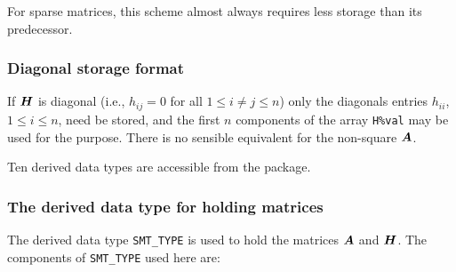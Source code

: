 \documentclass{galahad}
\begin{document}
For sparse matrices, this scheme almost always requires less storage than 
its predecessor.

\subsubsection{Diagonal storage format}\label{diagonal}
If ${\bm{H}}$ is diagonal (i.e., $h_{ij} = 0$ for all $1 \leq i \neq j \leq n$)
only the diagonals entries $h_{ii}$, $1 \leq i \leq n$,  need be stored,
and the first $n$ components of the array {\tt H\%val} may be used for 
the purpose. There is no sensible equivalent for the non-square ${\bm{A}}$.








\galtypes
Ten derived data types are accessible from the package.


\subsubsection{The derived data type for holding matrices}\label{typesmt}
The derived data type {\tt SMT\_TYPE} is used to hold the matrices ${\bm{A}}$
and ${\bm{H}}$. The components of {\tt SMT\_TYPE} used here are:
\end{document}
